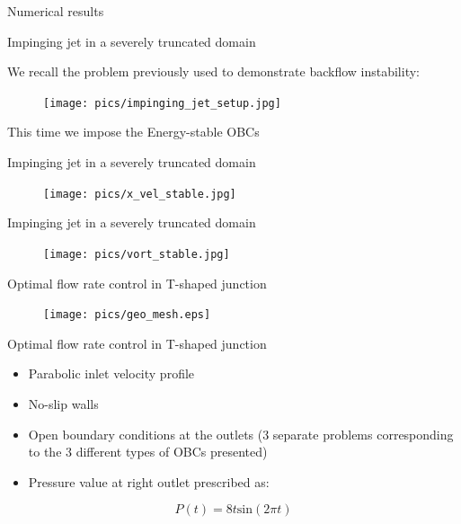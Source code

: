 \documentclass{beamer}
\begin{document}
\begin{frame}[standout]
    Numerical results
\end{frame}

\begin{frame}{Impinging jet in a severely truncated domain}
	
	We recall the problem previously used to demonstrate backflow instability:
	\begin{figure}
		\texttt{[image: pics/impinging\_jet\_setup.jpg]}
	\end{figure}
	This time we impose the Energy-stable OBCs

\end{frame}

\begin{frame}{Impinging jet in a severely truncated domain}

	\begin{figure}
		\texttt{[image: pics/x\_vel\_stable.jpg]}
	\end{figure}

\end{frame}

\begin{frame}{Impinging jet in a severely truncated domain}

	\begin{figure}
		\texttt{[image: pics/vort\_stable.jpg]}
	\end{figure}

\end{frame}

\begin{frame}{Optimal flow rate control in T-shaped junction}

	\begin{figure}
		\texttt{[image: pics/geo\_mesh.eps]}
	\end{figure}

\end{frame}

\begin{frame}{Optimal flow rate control in T-shaped junction}

	\begin{itemize}
		\setlength\itemsep{0.5em}
		\item Parabolic inlet velocity profile
		\item No-slip walls
		\item Open boundary conditions at the outlets (3 separate problems corresponding to the 3 different types of OBCs presented)
		\item Pressure value at right outlet prescribed as:
	\end{itemize}
	\begin{equation*}
		P\left(t\right)=8t\mathrm{sin}\left(2\pi t\right)
	\end{equation*}

\end{frame}
\end{document}
